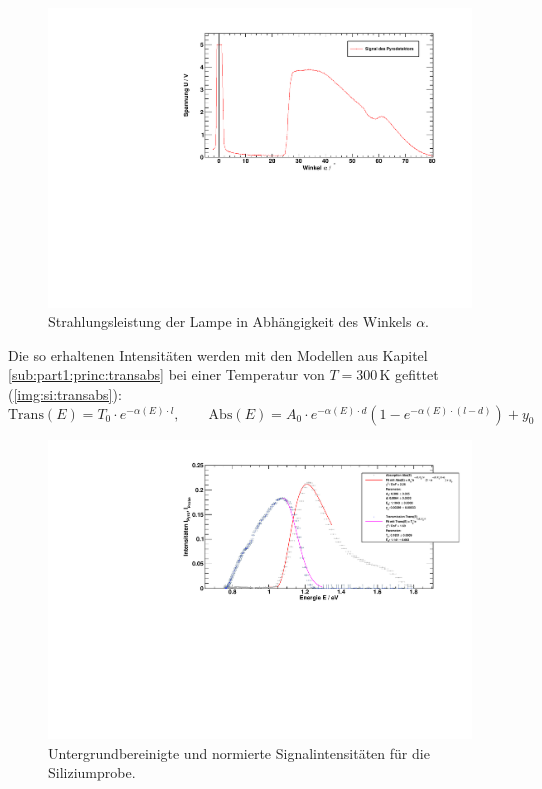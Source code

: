 \begin{figure}[H]
\begin{center}
  \includegraphics[width=\textwidth]{../img/part1/Si_Lampe_spectrum.pdf}
  \caption{Strahlungsleistung der Lampe in Abhängigkeit des Winkels $\alpha$.}
  \label{img:si:lampe}
\end{center}
\end{figure}

Die so erhaltenen Intensitäten werden mit den Modellen aus Kapitel \ref{sub:part1:princ:transabs} bei einer Temperatur von $T=300$\,K 
gefittet (\autoref{img:si:transabs}):
\begin{equation}
  \text{Trans}(E) = T_0 \cdot e^{- \alpha(E) \cdot l}, \qquad 
  \text{Abs}(E) = A_0 \cdot e^{- \alpha(E) \cdot d} \left( 1 - e^{- \alpha(E) \cdot (l - d)}  \right) + y_0
\end{equation}

\begin{figure}[H]
\begin{center}
  \includegraphics[width=\textwidth]{../img/part1/Si_fit_AbsTrans.pdf}
  \caption{Untergrundbereinigte und normierte Signalintensitäten für die Siliziumprobe.}
  \label{img:si:transabs}
\end{center}
\end{figure}

